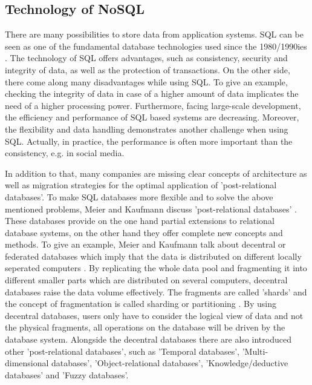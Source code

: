 \subsection{Technology of NoSQL} \label{nosql}

There are many possibilities to store data from application systems. \ac{SQL} can be seen as one of the fundamental database technologies used since the 1980/1990ies \cite[p.137 ff.]{nosql_meier}. The technology of SQL offers advantages, such as consistency, security and integrity of data, as well as the protection of transactions. On the other side, there come along many disadvantages while using SQL. To give an example, checking the integrity of data in case of a higher amount of data implicates the need of a higher processing power. Furthermore, facing large-scale development, the efficiency and performance of SQL based systems are decreasing. Moreover, the flexibility and data handling demonstrates another challenge when using SQL. Actually, in practice, the performance is often more important than the consistency, e.g. in social media.    

In addition to that, many companies are missing clear concepts of architecture as well as migration strategies for the optimal application of  'post-relational databases'. To make SQL databases more flexible and to solve the above mentioned problems, Meier and Kaufmann discuss 'post-relational databases' \cite[p.187 ff.]{nosql_meier}. These databases provide on the one hand partial extensions to relational database systems, on the other hand they offer complete new concepts and methods. To give an example, Meier and Kaufmann talk about decentral or federated databases which imply that the data is distributed on different locally seperated computers \cite[p.188 ff.]{nosql_meier}. By replicating the whole data pool and fragmenting it into different smaller parts which are distributed on several computers, decentral databases raise the data volume effectively. The fragments are called 'shards' and the concept of fragmentation is called sharding or partitioning \cite[p.188 ff.]{nosql_meier}. By using decentral databases, users only have to consider the logical view of data and not the physical fragments, all operations on the database will be driven by the database system.  
Alongside the decentral databases there are also introduced other 'post-relational databases', such as 'Temporal databases', 'Multi-dimensional databases', 'Object-relational databases', 'Knowledge/deductive databases' and 'Fuzzy databases'.

